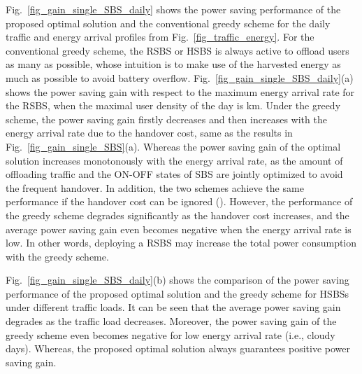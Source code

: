 \documentclass[12pt, draftclsnofoot,onecolumn]{IEEEtran}
\begin{document}
    \begin{figure*}[!t]
        \centering
        \hspace{2mm}
        \hfil
        \caption{Average power saving gain of single SBS under daily traffic and energy profiles.}
        \label{fig_gain_single_SBS_daily}
    \end{figure*}

Fig.~\ref{fig_gain_single_SBS_daily} shows the power saving performance of the proposed optimal solution and the conventional greedy scheme for the daily traffic and energy arrival profiles from Fig.~\ref{fig_traffic_energy}. For the conventional greedy scheme, the RSBS or HSBS is always active to offload users as many as possible, whose intuition is to make use of the harvested energy as much as possible to avoid battery overflow. Fig.~\ref{fig_gain_single_SBS_daily}(a) shows the power saving gain with respect to the maximum energy arrival rate for the RSBS, when the maximal user density of the day is km.
Under the greedy scheme, the power saving gain firstly decreases and then increases with the energy arrival rate due to the handover cost, same as the results in Fig.~\ref{fig_gain_single_SBS}(a). Whereas the power saving gain of the optimal solution increases monotonously with the energy arrival rate, as the amount of offloading traffic and the ON-OFF states of SBS are jointly optimized to avoid the frequent handover.
In addition, the two schemes achieve the same performance if the handover cost can be ignored (). However, the performance of the greedy scheme degrades significantly as the handover cost increases, and the average power saving gain even becomes negative when the energy arrival rate is low. In other words, deploying a RSBS may increase the total power consumption with the greedy scheme.

Fig.~\ref{fig_gain_single_SBS_daily}(b) shows the comparison of the power saving performance of the proposed optimal solution and the greedy scheme for HSBSs under different traffic loads. It can be seen that the average power saving gain degrades as the traffic load decreases. Moreover, the power saving gain of the greedy scheme even becomes negative for low energy arrival rate (i.e., cloudy days).
Whereas, the proposed optimal solution always guarantees positive power saving gain.
\end{document}
